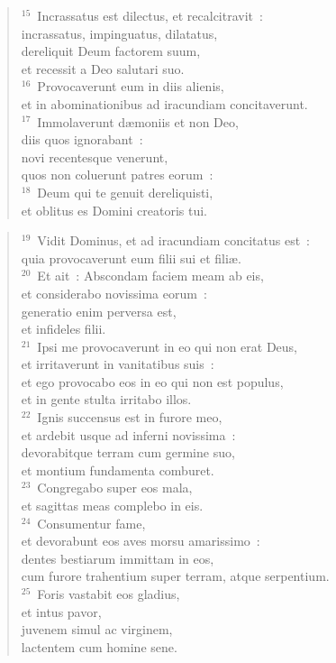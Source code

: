 \begin{flushleft}\begin{verse}${}^{15}$~Incrassatus est dilectus, et recalcitravit~:\\ incrassatus, impinguatus, dilatatus,\\ dereliquit Deum factorem suum,\\ et recessit a Deo salutari suo.\\
${}^{16}$~Provocaverunt eum in diis alienis,\\ et in abominationibus ad iracundiam concitaverunt.\\
${}^{17}$~Immolaverunt d\ae moniis et non Deo,\\ diis quos ignorabant~:\\ novi recentesque venerunt,\\ quos non coluerunt patres eorum~:\\
${}^{18}$~Deum qui te genuit dereliquisti,\\ et oblitus es Domini creatoris tui.\end{verse}\end{flushleft}


\begin{flushleft}\begin{verse}${}^{19}$~Vidit Dominus, et ad iracundiam concitatus est~:\\ quia provocaverunt eum filii sui et fili\ae .\\
${}^{20}$~Et ait~: Abscondam faciem meam ab eis,\\ et considerabo novissima eorum~:\\ generatio enim perversa est,\\ et infideles filii.\\
${}^{21}$~Ipsi me provocaverunt in eo qui non erat Deus,\\ et irritaverunt in vanitatibus suis~:\\ et ego provocabo eos in eo qui non est populus,\\ et in gente stulta irritabo illos.\\
${}^{22}$~Ignis succensus est in furore meo,\\ et ardebit usque ad inferni novissima~:\\ devorabitque terram cum germine suo,\\ et montium fundamenta comburet.\\
${}^{23}$~Congregabo super eos mala,\\ et sagittas meas complebo in eis.\\
${}^{24}$~Consumentur fame,\\ et devorabunt eos aves morsu amarissimo~:\\ dentes bestiarum immittam in eos,\\ cum furore trahentium super terram, atque serpentium.\\
${}^{25}$~Foris vastabit eos gladius,\\ et intus pavor,\\ juvenem simul ac virginem,\\ lactentem cum homine sene.\end{verse}\end{flushleft}


